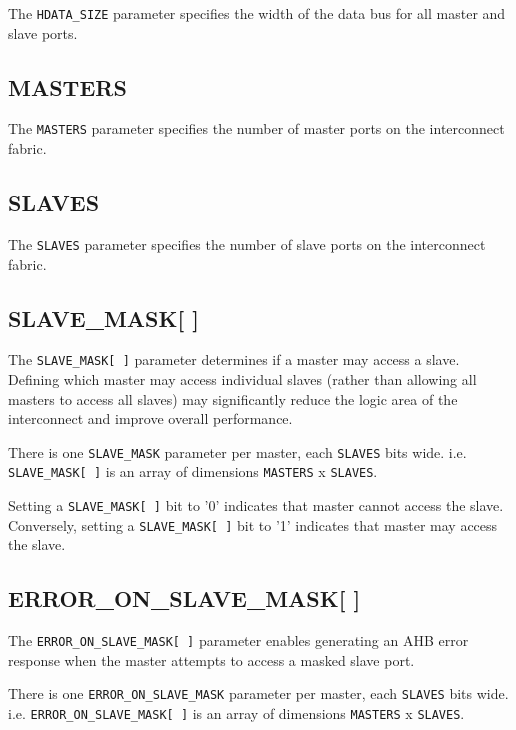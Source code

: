 The \texttt{HDATA\_SIZE} parameter specifies the width of the data bus for all
master and slave ports.

\subsection{MASTERS}\label{masters}

The \texttt{MASTERS} parameter specifies the number of master ports on the
interconnect fabric.

\subsection{SLAVES}\label{slaves}

The \texttt{SLAVES} parameter specifies the number of slave ports on the
interconnect fabric.

\subsection{SLAVE\_MASK[ ]}\label{slave_mask}

The \texttt{SLAVE\_MASK[\,]} parameter determines if a master may access a slave. Defining which
master may access individual slaves (rather than allowing all masters to access all slaves) may
significantly reduce the logic area of the interconnect and improve overall performance.

There is one \texttt{SLAVE\_MASK} parameter per master, each \texttt{SLAVES} bits wide.
i.e. \texttt{SLAVE\_MASK[\,]} is an array of dimensions \texttt{MASTERS} x \texttt{SLAVES}.

Setting a \texttt{SLAVE\_MASK[\,]} bit to '0' indicates that master cannot access the slave.
Conversely, setting a \texttt{SLAVE\_MASK[\,]} bit to '1' indicates that master may access the slave.

\subsection{ERROR\_ON\_SLAVE\_MASK[ ]}\label{error_on_slave_mask}

The \texttt{ERROR\_ON\_SLAVE\_MASK[\,]} parameter enables generating an AHB error response when the
master attempts to access a masked slave port.

There is one \texttt{ERROR\_ON\_SLAVE\_MASK} parameter per master, each \texttt{SLAVES} bits wide.
i.e. \texttt{ERROR\_ON\_SLAVE\_MASK[\,]} is an array of dimensions \texttt{MASTERS} x \texttt{SLAVES}.

